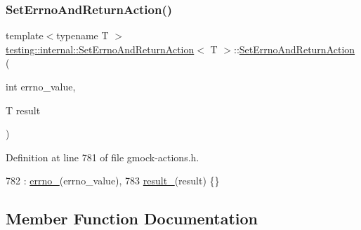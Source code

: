 \subsubsection{\texorpdfstring{Set\+Errno\+And\+Return\+Action()}{SetErrnoAndReturnAction()}}
{\footnotesize\ttfamily template$<$typename T $>$ \\
\hyperlink{classtesting_1_1internal_1_1SetErrnoAndReturnAction}{testing\+::internal\+::\+Set\+Errno\+And\+Return\+Action}$<$ T $>$\+::\hyperlink{classtesting_1_1internal_1_1SetErrnoAndReturnAction}{Set\+Errno\+And\+Return\+Action} (\begin{DoxyParamCaption}\item[{int}]{errno\+\_\+value,  }\item[{T}]{result }\end{DoxyParamCaption})\hspace{0.3cm}{\ttfamily [inline]}}



Definition at line 781 of file gmock-\/actions.\+h.


\begin{DoxyCode}
782       : \hyperlink{classtesting_1_1internal_1_1SetErrnoAndReturnAction_ac4f5ce108de323f1f76654c38aa883a3}{errno\_}(errno\_value),
783         \hyperlink{classtesting_1_1internal_1_1SetErrnoAndReturnAction_a271f5a3b41aa3a7f06fbd69ad19b1c77}{result\_}(result) \{\}
\end{DoxyCode}


\subsection{Member Function Documentation}
\mbox{\label{classtesting_1_1internal_1_1SetErrnoAndReturnAction_a18906b36848b148a809907d105823ccc}} 
